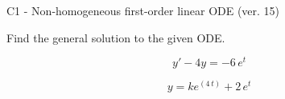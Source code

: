 \begin{exercise}
  \begin{exerciseTitle}C1 - Non-homogeneous first-order linear ODE (ver. 15)\end{exerciseTitle}
  \begin{exerciseStatement}
    
Find the general solution to the given ODE.

    
\[y'-4y= -6 \, e^{t}\]

  \end{exerciseStatement}
  \begin{exerciseAnswer}
    
\[y= k e^{\left(4 \, t\right)} + 2 \, e^{t}\]

  \end{exerciseAnswer}
\end{exercise}